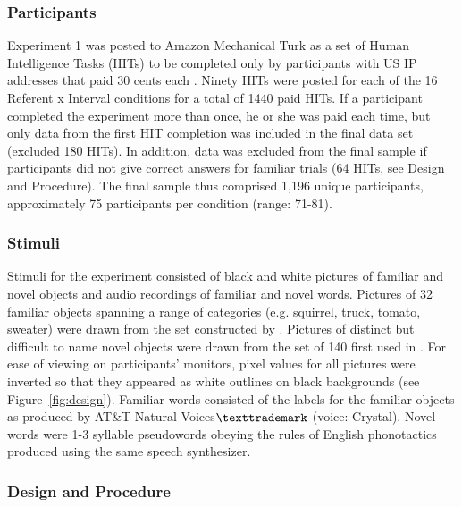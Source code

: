 \documentclass[man,floatsintext]{apa6}
\begin{document}
\subsubsection{Participants}

Experiment 1 was posted to Amazon Mechanical Turk as a set of Human Intelligence Tasks (HITs) to be completed only by participants with US IP addresses that paid 30 cents each \cite<for a detailed comparison of laboratory and Mechanical Turk studies see>{Crump2013}. Ninety HITs were posted for each of the 16 Referent x Interval conditions for a total of 1440 paid HITs. If a participant completed the experiment more than once, he or she was paid each time, but only data from the first HIT completion was included in the final data set (excluded 180 HITs). In addition, data was excluded from the final sample if participants did not give correct answers for familiar trials (64 HITs, see Design and Procedure). The final sample thus comprised 1,196 unique participants, approximately 75 participants per condition (range: 71-81).

\subsubsection{Stimuli}

Stimuli for the experiment consisted of black and white pictures of familiar and novel objects and audio recordings of familiar and novel words. Pictures of 32 familiar objects spanning a range of categories (e.g. squirrel, truck, tomato, sweater) were drawn from the set constructed by . Pictures of distinct but difficult to name novel objects were drawn from the set of 140 first used in . For ease of viewing on participants' monitors, pixel values for all pictures were inverted so that they appeared as white outlines on black backgrounds (see Figure~\ref{fig:design}). Familiar words consisted of the labels for the familiar objects as produced by AT\&T Natural Voices$\texttrademark$ (voice: Crystal). Novel words were 1-3 syllable pseudowords obeying the rules of English phonotactics produced using the same speech synthesizer. 

\subsubsection{Design and Procedure}
\end{document}
